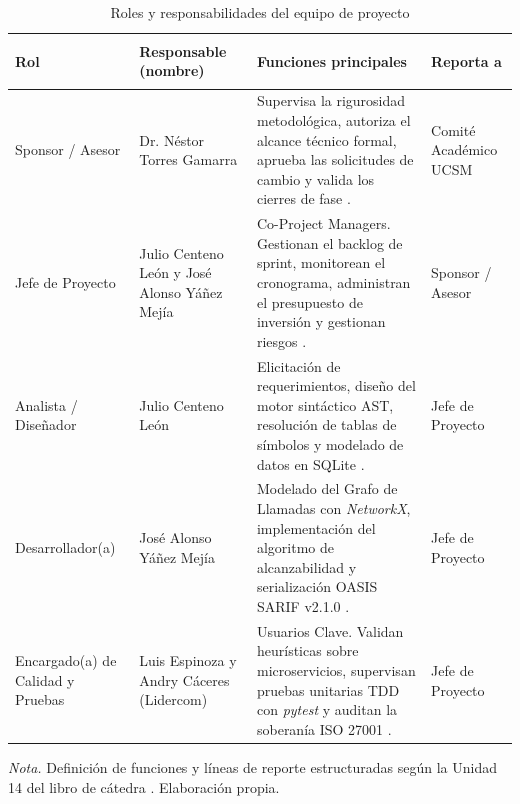 \begin{table}[H]
\centering
\caption{Roles y responsabilidades del equipo de proyecto}
\label{tab:roles_responsabilidades}
\small
{}
\begin{tabularx}{\textwidth}{>{\bfseries\raggedright\arraybackslash}p{3.2cm} >{\raggedright\arraybackslash}p{3.4cm} X >{\raggedright\arraybackslash}p{2.6cm}}
\toprule
\textbf{Rol} & \textbf{Responsable (nombre)} & \textbf{Funciones principales} & \textbf{Reporta a} \\
\midrule
Sponsor / Asesor & 
Dr. Néstor Torres Gamarra & 
Supervisa la rigurosidad metodológica, autoriza el alcance técnico formal, aprueba las solicitudes de cambio y valida los cierres de fase \parencite{torres2026proyecto}. & 
Comité Académico UCSM \\ %
\addlinespace
Jefe de Proyecto & 
Julio Centeno León y \newline José Alonso Yáñez Mejía & 
Co-Project Managers. Gestionan el backlog de sprint, monitorean el cronograma, administran el presupuesto de inversión y gestionan riesgos \parencite{pmi2021pmbok}. & 
Sponsor / Asesor \\ %
\addlinespace
Analista / Diseñador & 
Julio Centeno León & 
Elicitación de requerimientos, diseño del motor sintáctico AST, resolución de tablas de símbolos y modelado de datos en SQLite \parencite{salis2021pycg}. & 
Jefe de Proyecto \\ %
\addlinespace
Desarrollador(a) & 
José Alonso Yáñez Mejía & 
Modelado del Grafo de Llamadas con \textit{NetworkX}, implementación del algoritmo de alcanzabilidad y serialización OASIS SARIF v2.1.0 \parencite{oasis2019sarif}. & 
Jefe de Proyecto \\ %
\addlinespace
Encargado(a) de Calidad y Pruebas & 
Luis Espinoza y \newline Andry Cáceres (Lidercom) & 
Usuarios Clave. Validan heurísticas sobre microservicios, supervisan pruebas unitarias TDD con \textit{pytest} y auditan la soberanía ISO 27001 \parencite{ladisa2023sok}. & 
Jefe de Proyecto \\ %
\bottomrule
\end{tabularx}
\vspace{2pt}
\begin{flushleft}
\scriptsize \textit{Nota.} Definición de funciones y líneas de reporte estructuradas según la Unidad 14 del libro de cátedra \parencite{torres2026proyecto}. Elaboración propia. %
\end{flushleft}
\end{table}

